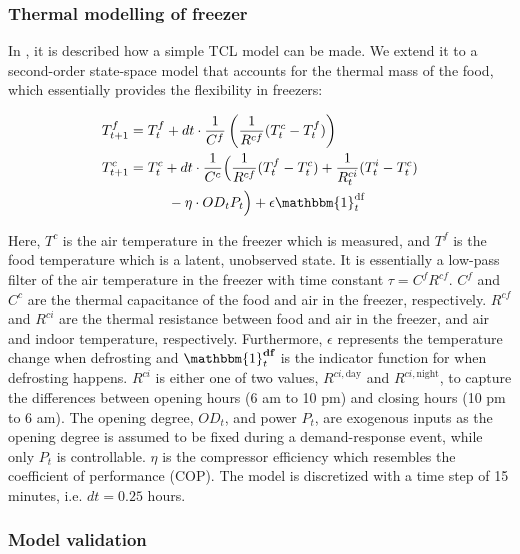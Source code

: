 \subsubsection{Thermal modelling of freezer}

In \cite{hao2014aggregate}, it is described how a simple TCL model can be made. We extend it to a second-order state-space model that accounts for the thermal mass of the food, which essentially provides the flexibility in freezers:

\begin{subequations}\label{eq:2ndFreezerStateSpace}
    \begin{align}
        T^{f}_{t+1} & = T^{f}_{t} + dt \cdot \frac{1}{C^f}\left(\frac{1}{R^{cf}} (T^{c}_{t} - T^{f}_{t}) \right)                                                                              \\
        T^{c}_{t+1} & = T^{c}_t + dt \cdot \frac{1}{C^c}\Bigl(\frac{1}{R^{cf}} (T^{f}_t - T^{c}_t) + \frac{1}{R^{ci}_{t}} (T^{i}_t - T^{c}_t)                                          \notag \\ & \mspace{50mu} - \eta \cdot OD_t P_t \Bigr) + \epsilon \mathbbm{1}^{\text{df}}_{t}
    \end{align}
\end{subequations}

Here, $T^c$ is the air temperature in the freezer which is measured, and $T^f$ is the food temperature which is a latent, unobserved state. It is essentially a low-pass filter of the air temperature in the freezer with time constant $\tau = C^f R^{cf}$. $C^f$ and $C^c$ are the thermal capacitance of the food and air in the freezer, respectively. $R^{cf}$ and $R^{ci}$ are the thermal resistance between food and air in the freezer, and air and indoor temperature, respectively. Furthermore, $\epsilon$ represents the temperature change when defrosting and $\mathbbm{1}^{\textbf{df}}_{t}$ is the indicator function for when defrosting happens. $R^{ci}$ is either one of two values, $R^{ci, \text{day}}$ and $R^{ci, \text{night}}$, to capture the differences between opening hours (6 am to 10 pm) and closing hours (10 pm to 6 am). The opening degree, $OD_t$, and power $P_t$, are exogenous inputs as the opening degree is assumed to be fixed during a demand-response event, while only $P_t$ is controllable. $\eta$ is the compressor efficiency which resembles the coefficient of performance (COP). The model is discretized with a time step of 15 minutes, i.e. $dt = 0.25$ hours.

\subsubsection{Model validation}

